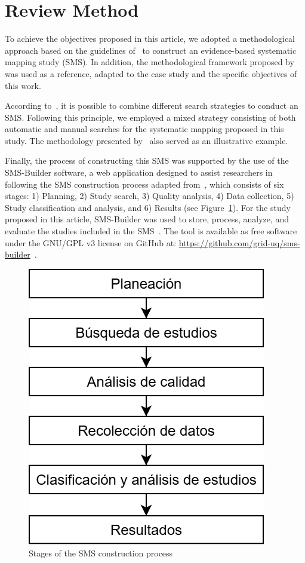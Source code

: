 \section{Review Method}\label{sec:metodo-revision}

To achieve the objectives proposed in this article, we adopted a methodological approach based on the guidelines of~\cite{Kitchenham2010792, budgen2008using} to construct an evidence-based systematic mapping study (SMS). In addition, the methodological framework proposed by~\cite{Sepúlveda202141} was used as a reference, adapted to the case study and the specific objectives of this work.

According to~\cite{Erica2017HybridSS, Nguyen201562}, it is possible to combine different search strategies to conduct an SMS. Following this principle, we employed a mixed strategy consisting of both automatic and manual searches for the systematic mapping proposed in this study. The methodology presented by~\cite{Ali201988196} also served as an illustrative example.

Finally, the process of constructing this SMS was supported by the use of the SMS-Builder software, a web application designed to assist researchers in following the SMS construction process adapted from~\cite{Kitchenham2010792}, which consists of six stages: 1) Planning, 2) Study search, 3) Quality analysis, 4) Data collection, 5) Study classification and analysis, and 6) Results (see Figure~\ref{figure:Stages}). For the study proposed in this article, SMS-Builder was used to store, process, analyze, and evaluate the studies included in the SMS~\cite{Candela2022100935}. The tool is available as free software under the GNU/GPL v3 license on GitHub at: \url{https://github.com/grid-uq/sms-builder}~\cite{Candela2022100935}.

\begin{figure}[htbp]
	\centering
	\includegraphics[width=0.6\linewidth]{resources/figures/sms-Etapas.drawio.png}
	\caption{Stages of the SMS construction process}
	\label{figure:Stages}
\end{figure}

